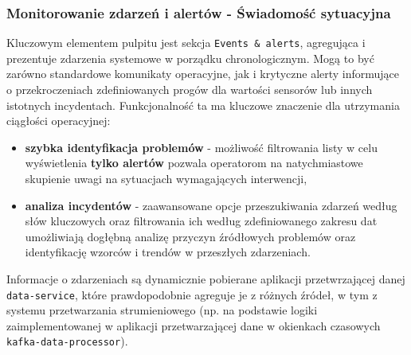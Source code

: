\subsubsection{Monitorowanie zdarzeń i alertów - Świadomość sytuacyjna}
Kluczowym elementem pulpitu jest sekcja \texttt{Events \& alerts}, agregująca i prezentuje zdarzenia systemowe w porządku chronologicznym. Mogą to być zarówno standardowe komunikaty operacyjne, jak i krytyczne alerty informujące o przekroczeniach zdefiniowanych progów dla wartości sensorów lub innych istotnych incydentach. Funkcjonalność ta ma kluczowe znaczenie dla utrzymania ciągłości operacyjnej:
\begin{itemize}
    \item \textbf{szybka identyfikacja problemów} - możliwość filtrowania listy w celu wyświetlenia \textbf{tylko alertów} pozwala operatorom na natychmiastowe skupienie uwagi na sytuacjach wymagających interwencji,
    \item \textbf{analiza incydentów} - zaawansowane opcje przeszukiwania zdarzeń według słów kluczowych oraz filtrowania ich według zdefiniowanego zakresu dat umożliwiają dogłębną analizę przyczyn źródłowych problemów oraz identyfikację wzorców i trendów w przeszłych zdarzeniach.
\end{itemize}
Informacje o zdarzeniach są dynamicznie pobierane aplikacji przetwrzającej danej \texttt{data-service}, które prawdopodobnie agreguje je z różnych źródeł, w tym z systemu przetwarzania strumieniowego (np. na podstawie logiki zaimplementowanej w aplikacji przetwarzającej dane w okienkach czasowych \texttt{kafka-data-processor}).

